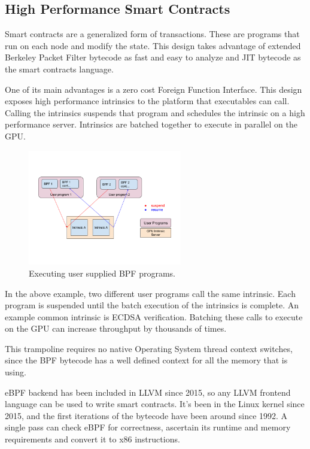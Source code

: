 \documentclass[12pt]{article}
\begin{document}
\subsection{High Performance Smart Contracts}\label{sec:smartcontracts}

Smart contracts are a generalized form of transactions. These are programs that run on each node and modify the state. This design takes advantage of extended Berkeley Packet Filter bytecode as fast and easy to analyze and JIT bytecode as the smart contracts language.

One of its main advantages is a zero cost Foreign Function Interface. This design exposes high performance intrinsics to the platform that executables can call. Calling the intrinsics suspends that program and schedules the intrinsic on a high performance server. Intrinsics are batched together to execute in parallel on the GPU.

\begin{figure}
  \begin{center}
    \centering
    \includegraphics[width=0.6\textwidth]{figures/fig_11.png}
    \caption[Fig 11]{Executing user supplied BPF programs.\label{fig_11}}
  \end{center}
  \end{figure}

In the above example, two different user programs call the same intrinsic. Each program is suspended until the batch execution of the intrinsics is complete. An example common intrinsic is ECDSA verification. Batching these calls to execute on the GPU can increase throughput by thousands of times.

This trampoline requires no native Operating System thread context switches, since the BPF bytecode has a well defined context for all the memory that is using.

eBPF backend has been included in LLVM since 2015, so any LLVM frontend language can be used to write smart contracts. It’s been in the Linux kernel since 2015, and the first iterations of the bytecode have been around since 1992. A single pass can check eBPF for correctness, ascertain its runtime and memory requirements and convert it to x86 instructions.
\end{document}
